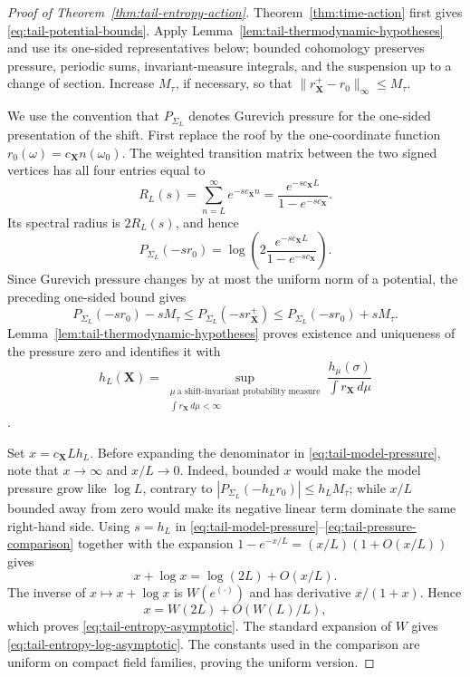 \documentclass[11pt]{amsart}
\numberwithin{equation}{section}
\theoremstyle{definition}
\theoremstyle{remark}
\begin{document}
\begin{proof}[Proof of Theorem~\ref{thm:tail-entropy-action}]
Theorem~\ref{thm:time-action} first gives
\eqref{eq:tail-potential-bounds}.  Apply
Lemma~\ref{lem:tail-thermodynamic-hypotheses} and use its one-sided
representatives below; bounded cohomology preserves pressure, periodic
sums, invariant-measure integrals, and the suspension up to a change of
section.  Increase $M_\tau$, if necessary, so that
$\|r_{\mathbf X}^+-r_0\|_\infty\le M_\tau$.

We use the convention that $P_{\Sigma_L}$ denotes Gurevich pressure for
the one-sided presentation of the shift.  First replace the roof by the one-coordinate function
$r_0(\omega)=c_{\mathbf X}n(\omega_0)$.  The weighted transition matrix
between the two signed vertices has all four entries equal to
\begin{equation}\label{eq:tail-geometric-series}
 R_L(s)=\sum_{n=L}^\infty e^{-s c_{\mathbf X}n}
       =\frac{e^{-s c_{\mathbf X}L}}
              {1-e^{-s c_{\mathbf X}}}.
\end{equation}
Its spectral radius is $2R_L(s)$, and hence
\begin{equation}\label{eq:tail-model-pressure}
 P_{\Sigma_L}(-s r_0)
 =\log\!\left(
       2\frac{e^{-s c_{\mathbf X}L}}
               {1-e^{-s c_{\mathbf X}}}\right).
\end{equation}
Since Gurevich pressure changes by at most the uniform norm of a potential,
the preceding one-sided bound gives
\begin{equation}\label{eq:tail-pressure-comparison}
 P_{\Sigma_L}(-s r_0)-sM_\tau
 \le P_{\Sigma_L}(-s r_{\mathbf X}^+)
 \le P_{\Sigma_L}(-s r_0)+sM_\tau.
\end{equation}
Lemma~\ref{lem:tail-thermodynamic-hypotheses} proves existence and
uniqueness of the pressure zero and identifies it with
\begin{equation}\label{eq:tail-variational-entropy}
 h_L(\mathbf X)=
 \sup_{\substack{\mu\ \text{a shift-invariant probability measure}\\
                  \int r_{\mathbf X}\,d\mu<\infty}}
 \frac{h_\mu(\sigma)}{\int r_{\mathbf X}\,d\mu}
\end{equation}.

Set $x=c_{\mathbf X}Lh_L$.  Before expanding the denominator in
\eqref{eq:tail-model-pressure}, note that $x\to\infty$ and $x/L\to0$.
Indeed, bounded $x$ would
make the model pressure grow like $\log L$, contrary to
$|P_{\Sigma_L}(-h_Lr_0)|\le h_LM_\tau$; while $x/L$ bounded away from zero
would make its negative linear term dominate the same right-hand side.
Using $s=h_L$ in
\eqref{eq:tail-model-pressure}--\eqref{eq:tail-pressure-comparison} together
with the expansion $1-e^{-x/L}=(x/L)(1+O(x/L))$ gives
\begin{equation}\label{eq:tail-lambert-equation}
 x+\log x=\log(2L)+O(x/L).
\end{equation}
The inverse of $x\mapsto x+\log x$ is $W(e^{(\cdot)})$ and has derivative
$x/(1+x)$.  Hence
\[
 x=W(2L)+O(W(L)/L),
\]
which proves \eqref{eq:tail-entropy-asymptotic}.  The standard expansion of
$W$ gives \eqref{eq:tail-entropy-log-asymptotic}.  The constants used in
the comparison are uniform on compact field families, proving the uniform
version.


\end{proof}
\end{document}

